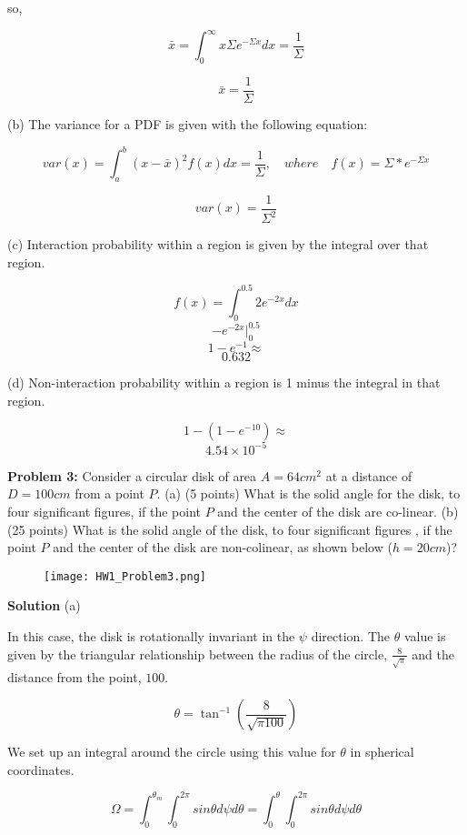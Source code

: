 \documentclass{amsart}
\theoremstyle{definition}
\begin{document}
so,

$$ \bar{x} = \int_{0}^{\infty}{x\Sigma e^{-\Sigma x}dx} = \frac{1}{\Sigma} $$

$$ \boxed{ \bar{x} = \frac{1}{\Sigma}} $$


(b)
The variance for a PDF is given with the following equation:

$$ var(x) = \int_{a}^{b}{(x-\bar{x})^2f(x)dx} = \frac{1}{\Sigma}, \quad where \quad f(x) = \Sigma*e^{-\Sigma x} $$

$$ \boxed{ var(x) = \frac{1}{\Sigma^2}} $$


(c) 
Interaction probability within a region is given by the integral over that region.

$$ f(x) = \int_0^{0.5} 2 e^{-2x}dx $$
$$ -e^{-2x} |^{0.5}_0 $$
$$ 1 - e^{-1} \approx $$
$$ \boxed{0.632} $$


(d)
Non-interaction probability within a region is 1 minus the integral in that region.

$$ 1 - (1 - e^{-10}) \approx $$
$$ \boxed{4.54 \times 10^{-5}} $$


\newpage
\textbf{Problem 3:} Consider a circular disk of area $A=64 cm^2$ at a distance of $D=100 cm$ from a point $P$. \newline
(a) (5 points) What is the solid angle for the disk, to four significant figures, if the point $P$ and the center of the disk are co-linear. \newline
(b) (25 points) What is the solid angle of the disk, to four significant figures , if the point $P$ and the center of the disk are non-colinear, as shown below ($h=20 cm$)? \newline
\begin{figure}[h!]
                \texttt{[image: HW1\_Problem3.png]}
\end{figure}
\bigbreak
\textbf{Solution}
\bigbreak
(a)

In this case, the disk is rotationally invariant in the $\psi$ direction.
The $\theta$ value is given by the triangular relationship between the radius of the circle, $\frac{8}{\sqrt{\pi}}$ and the distance from the point, $100$.

$$ \theta = \tan^{-1}(\frac{8}{\sqrt{\pi 100}}) $$

We set up an integral around the circle using this value for $\theta$ in spherical coordinates.

$$ \Omega = \int_0^{\theta_m} \int_0^{2\pi} sin \theta d \psi d\theta = \int_0^{\theta} \int_0^{2\pi} sin \theta d \psi d\theta $$
\end{document}
